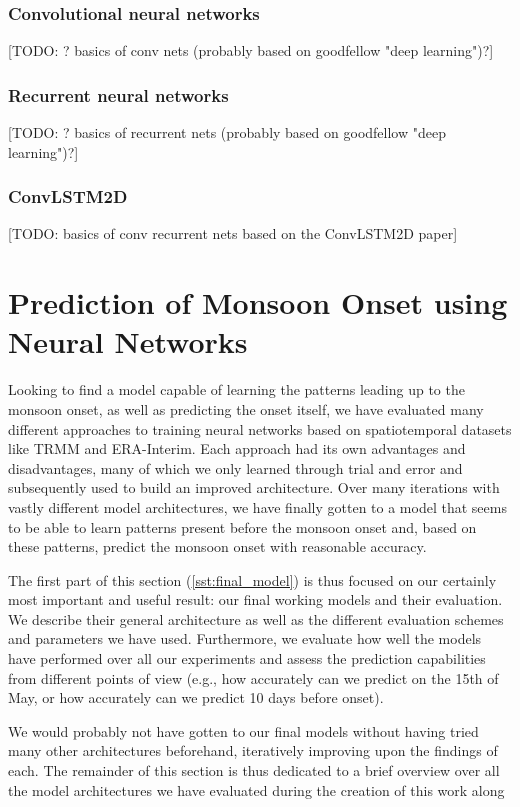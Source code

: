 \subsubsection{Convolutional neural networks}
\label{sst:convolutional_networks}
[TODO: ? basics of conv nets (probably based on goodfellow "deep learning")?]

\subsubsection{Recurrent neural networks}
\label{sst:recurrent_networks}
[TODO: ? basics of recurrent nets (probably based on goodfellow "deep learning")?]

\subsubsection{ConvLSTM2D}
[TODO: basics of conv recurrent nets based on the ConvLSTM2D paper]


\newpage
\section{Prediction of Monsoon Onset using Neural Networks}
\label{st:nn_implementation}
Looking to find a model capable of learning the patterns leading up to the monsoon onset, as well as predicting the onset itself, we have evaluated many different approaches to training neural networks based on spatiotemporal datasets like TRMM and ERA-Interim. Each approach had its own advantages and disadvantages, many of which we only learned through trial and error and subsequently used to build an improved architecture. Over many iterations with vastly different model architectures, we have finally gotten to a model that seems to be able to learn patterns present before the monsoon onset and, based on these patterns, predict the monsoon onset with reasonable accuracy.

The first part of this section (\cref{sst:final_model}) is thus focused on our certainly most important and useful result: our final working models and their evaluation. We describe their general architecture as well as the different evaluation schemes and parameters we have used. Furthermore, we evaluate how well the models have performed over all our experiments and assess the prediction capabilities from different points of view (e.g., how accurately can we predict on the 15th of May, or how accurately can we predict 10 days before onset).

We would probably not have gotten to our final models without having tried many other architectures beforehand, iteratively improving upon the findings of each. The remainder of this section is thus dedicated to a brief overview over all the model architectures we have evaluated during the creation of this work along


